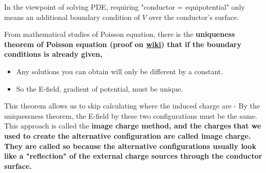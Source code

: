 \documentclass[class=article, crop=false, 12pt]{standalone}
\begin{document}
In the viewpoint of solving PDE, 
requiring "conductor = equipotential" only means an additional boundary condition of $V$ over the conductor's surface.


From mathematical studies of Poisson equation,
there is the \bf{uniqueness theorem of Poisson equation} 
(proof on \href{https://en.wikipedia.org/wiki/Uniqueness_theorem_for_Poisson%27s_equation}{wiki}) 
that if the boundary conditions is already given, 
\begin{itemize}
    \item Any solutions you can obtain will only be different by a constant. 
    \item So the E-field, gradient of potential, must be unique.
\end{itemize}

This theorem allows us to skip calculating where the induced charge are - 
By the uniquessness theorem, 
the E-field by these two configurations must be the same.\\

This approach is called the \bf{image charge method},
and the charges that we used to create the alternative configuration are called
\bf{image charge}.
They are called so because the alternative configurations usually look like
a "reflection" of the external charge sources through the conductor surface.
\end{document}
